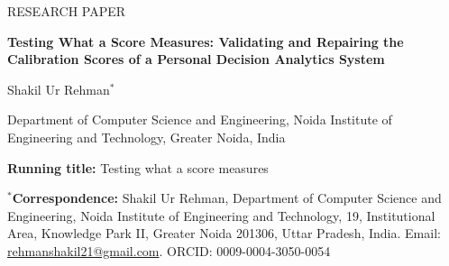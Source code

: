 \documentclass[12pt,a4paper]{article}
\begin{document}
\thispagestyle{fancy}
\begin{flushleft}
{\small RESEARCH PAPER}\par\bigskip
{\LARGE\bfseries Testing What a Score Measures: Validating and Repairing the Calibration Scores of a Personal Decision Analytics System\par}
\bigskip
{\large Shakil Ur Rehman$^{*}$}\par\medskip
Department of Computer Science and Engineering, Noida Institute of Engineering and Technology, Greater Noida, India\par\bigskip
\textbf{Running title:} Testing what a score measures\par\medskip
\textbf{$^{*}$Correspondence:} Shakil Ur Rehman, Department of Computer Science and Engineering, Noida Institute of Engineering and Technology, 19, Institutional Area, Knowledge Park II, Greater Noida 201306, Uttar Pradesh, India. Email: \href{mailto:rehmanshakil21@gmail.com}{rehmanshakil21@gmail.com}. ORCID: 0009-0004-3050-0054\par
\end{flushleft}
\medskip
\end{document}
